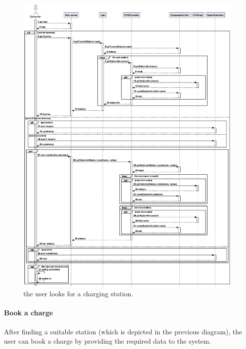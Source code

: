 \begin{figure}[h!]
    \centering
    \includegraphics[width=\columnwidth]{./images/sequences/emsp/lookup}
    \caption{the user looks for a charging station.}
\end{figure}

\pagebreak

\paragraph{Book a charge} After finding a suitable station (which is depicted in the previous diagram), the user can book a charge by providing the required data to the system.

